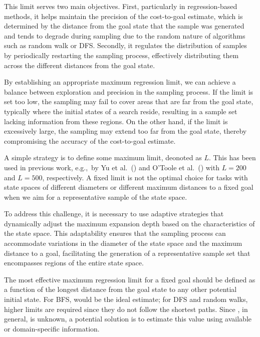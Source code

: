 This limit serves two main objectives. First, particularly in regression-based methods, it helps maintain the precision of the cost-to-goal estimate, which is determined by the distance from the goal state that the sample was generated and tends to degrade during sampling due to the random nature of algorithms such as random walk or DFS. Secondly, it regulates the distribution of samples by periodically restarting the sampling process, effectively distributing them across the different distances from the goal state.

By establishing an appropriate maximum regression limit, we can achieve a balance between exploration and precision in the sampling process. If the limit is set too low, the sampling may fail to cover areas that are far from the goal state, typically where the initial states of a search reside, resulting in a sample set lacking information from these regions. On the other hand, if the limit is excessively large, the sampling may extend too far from the goal state, thereby compromising the accuracy of the cost-to-goal estimate.

A simple strategy is to define some maximum limit, deonoted as $L$. This has been used in previous work, e.g.,~by Yu et al.~(\citeyear{Yu.etal/2020}) and O'Toole et al.~(\citeyear{OToole/2022}) with $L=200$ and $L=500$, respectively. A fixed limit is not the optimal choice for tasks with state spaces of different diameters or different maximum distances to a fixed goal when we aim for a representative sample of the state space.

To address this challenge, it is necessary to use adaptive strategies that dynamically adjust the maximum expansion depth based on the characteristics of the state space. This adaptability ensures that the sampling process can accommodate variations in the diameter of the state space and the maximum distance to a goal, facilitating the generation of a representative sample set that encompasses regions of the entire state space.

The most effective maximum regression limit for a fixed goal should be defined as a function of the longest distance \distfarthest from the goal state to any other potential initial state. For BFS, \distfarthest would be the ideal estimate; for DFS and random walks, higher limits are required since they do not follow the shortest paths.
Since \distfarthest, in general, is unknown, a potential solution is to estimate this value using available or domain-specific information.

